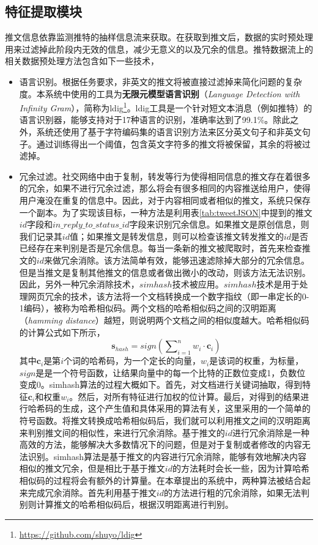 \subsection{特征提取模块}
\label{subsec2:feaureExtraction}
推文信息依靠监测推特的抽样信息流来获取。在获取到推文后，数据的实时预处理用来过滤掉此阶段内无效的信息，减少无意义的以及冗余的信息。推特数据流上的相关数据预处理方法包含如下一些技术，
\begin{itemize}
  \item 语言识别。根据任务要求，非英文的推文将被直接过滤掉来简化问题的复杂度。本系统中使用的工具为\textbf{无限元模型语言识别}（\textit{Language Detection with Infinity Gram}），简称为ldig\footnote{\url{https://github.com/shuyo/ldig}}。ldig工具是一个针对短文本消息（例如推特）的语言识别器，能够支持对于17种语言的识别，准确率达到了99.1\%。除此之外，系统还使用了基于字符编码集的语言识别方法来区分英文句子和非英文句子。通过训练得出一个阈值，包含英文字符多的推文将被保留，其余的将被过滤掉。
  \item 冗余过滤。社交网络中由于复制，转发等行为使得相同信息的推文存在着很多的冗余，如果不进行冗余过滤，那么将会有很多相同的内容推送给用户，使得用户淹没在重复的信息中。因此，对于内容相同或者相似的推文，系统只保存一个副本。为了实现该目标，一种方法是利用表\ref{tab:tweetJSON}中提到的推文$id$字段和$in\_reply\_to\_status\_id$字段来识别冗余信息。如果推文是原创信息，则我们记录其$id$值；如果推文是转发信息，则可以检查该推文转发推文的$id$是否已经存在来判别是否是冗余信息。每当一条新的推文被爬取时，首先来检查推文的$id$来做冗余消除。该方法简单有效，能够迅速滤除掉大部分的冗余信息。但是当推文是复制其他推文的信息或者做出微小的改动，则该方法无法识别。因此，另外一种冗余消除技术，$simhash$技术被应用。$simhash$技术是用于处理网页冗余的技术，该方法将一个文档转换成一个数字指纹（即一串定长的0-1编码），被称为哈希相似码。两个文档的哈希相似码之间的汉明距离（\textit{hamming distance}）越短，则说明两个文档之间的相似度越大。哈希相似码的计算公式如下所示，
  \begin{equation}
  \label{simhash}
    {\mathbf{s}_{hash}} = sign(\sum\nolimits_{i = 1}^n {{w_i} \cdot {\mathbf{c}_i}} )
  \end{equation}
其中$\mathbf{c}_i$是第$i$个词的哈希码，为一个定长的向量，$w_i$是该词的权重，为标量，$sign$是是一个符号函数，让结果向量中的每一个比特的正数位变成1，负数位变成0。simhash算法的过程大概如下。首先，对文档进行关键词抽取，得到特征$\mathbf{c}_i$和权重$w_i$。然后，对所有特征进行加权的位计算。最后，对得到的结果进行哈希码的生成，这个产生值和具体采用的算法有关，这里采用的一个简单的符号函数。将推文转换成哈希相似码后，我们就可以利用推文之间的汉明距离来判别推文间的相似性，来进行冗余消除。基于推文的$id$进行冗余消除是一种高效的方法，能够解决大多数情况下的问题，但是对于复制或者修改的内容无法识别。simhash算法是基于推文的内容进行冗余消除，能够有效地解决内容相似的推文冗余，但是相比于基于推文$id$的方法耗时会长一些，因为计算哈希相似码的过程将会有额外的计算量。在本章提出的系统中，两种算法被结合起来完成冗余消除。首先利用基于推文$id$的方法进行粗的冗余消除，如果无法判别则计算推文的哈希相似码后，根据汉明距离进行判别。
\end{itemize}

